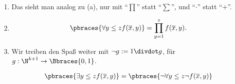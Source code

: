 \begin{solution}
\begin{enumerate}[label = (\alph*)]
    \item Das sieht man analog zu (a), nur mit \enquote{$\prod$} statt \enquote{$\sum$}, und \enquote{$\cdot$} statt \enquote{$+$}.
    
    \item

    \begin{align*}
        \pbraces
        {
            \forall y \leq z
                f(\overline x, y)
        }
        =
        \prod_{y=1}^z
            f(\overline x, y).
    \end{align*}

    \item Wir treiben den Spaß weiter mit $\neg g := 1 \divdot g$, für $g: \N^{k+1} \to \Bbraces{0, 1}$.
    
    \begin{align*}
        \pbraces
        {
            \exists y \leq z
                f(\overline x, y)
        }
        =
        \pbraces
        {
            \neg
            \forall y \leq z
                \neg f(\overline x, y)
        }
    \end{align*}

\end{enumerate}

\end{solution}

